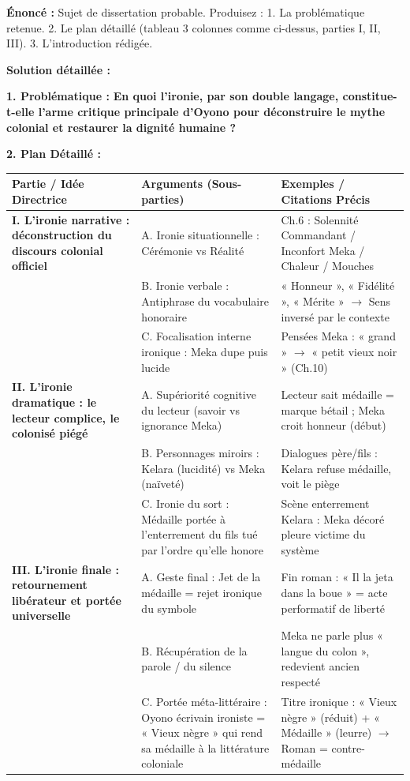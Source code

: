 \documentclass[11pt]{article}
\begin{document}
\begin{exoresolu}
\textbf{Énoncé :} Sujet de dissertation probable. Produisez : 1. La problématique retenue. 2. Le plan détaillé (tableau 3 colonnes comme ci-dessus, parties I, II, III). 3. L'introduction rédigée.

\tcblower
\textbf{Solution détaillée :}

\textbf{1. Problématique :} \textbf{En quoi l'ironie, par son double langage, constitue-t-elle l'arme critique principale d'Oyono pour déconstruire le mythe colonial et restaurer la dignité humaine ?}

\textbf{2. Plan Détaillé :}
\begin{center}
\begin{tabularx}{\linewidth}{|>{\bfseries}X|X|X|}\hline
\rowcolor{popblueL} \textbf{Partie / Idée Directrice} & \textbf{Arguments (Sous-parties)} & \textbf{Exemples / Citations Précis} \\ \hline
\textbf{I. L'ironie narrative : déconstruction du discours colonial officiel} & A. Ironie situationnelle : Cérémonie vs Réalité & Ch.6 : Solennité Commandant / Inconfort Meka / Chaleur / Mouches \\
 & B. Ironie verbale : Antiphrase du vocabulaire honoraire & « Honneur », « Fidélité », « Mérite » $\to$ Sens inversé par le contexte \\
 & C. Focalisation interne ironique : Meka dupe puis lucide & Pensées Meka : « grand » $\to$ « petit vieux noir » (Ch.10) \\ \hline
\textbf{II. L'ironie dramatique : le lecteur complice, le colonisé piégé} & A. Supériorité cognitive du lecteur (savoir vs ignorance Meka) & Lecteur sait médaille = marque bétail ; Meka croit honneur (début) \\
 & B. Personnages miroirs : Kelara (lucidité) vs Meka (naïveté) & Dialogues père/fils : Kelara refuse médaille, voit le piège \\
 & C. Ironie du sort : Médaille portée à l'enterrement du fils tué par l'ordre qu'elle honore & Scène enterrement Kelara : Meka décoré pleure victime du système \\ \hline
\textbf{III. L'ironie finale : retournement libérateur et portée universelle} & A. Geste final : Jet de la médaille = rejet ironique du symbole & Fin roman : « Il la jeta dans la boue » = acte performatif de liberté \\
 & B. Récupération de la parole / du silence & Meka ne parle plus « langue du colon », redevient ancien respecté \\
 & C. Portée méta-littéraire : Oyono écrivain ironiste = « Vieux nègre » qui rend sa médaille à la littérature coloniale & Titre ironique : « Vieux nègre » (réduit) + « Médaille » (leurre) $\to$ Roman = contre-médaille \\ \hline
\end{tabularx}
\end{center}


\end{exoresolu}
\end{document}
